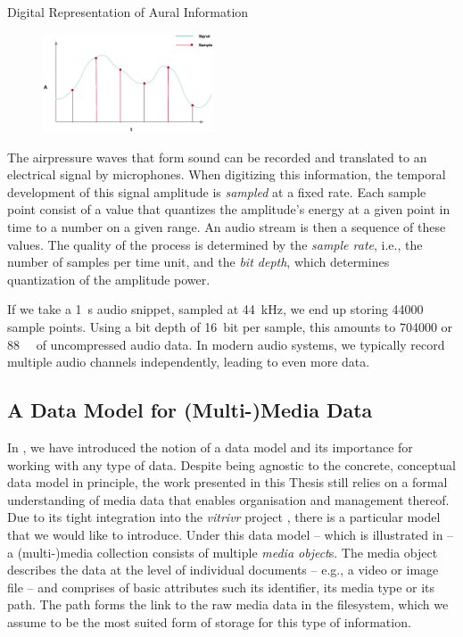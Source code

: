 \begin{example}[label=example:representation_audio_information]{Digital Representation of Aural Information}{}
    \begin{figure}
        \includegraphics[width=0.45\textwidth]{figures/example-audio-signal.eps}
    \end{figure}
    The airpressure waves that form sound can be recorded and translated to an electrical signal by microphones. When digitizing this information, the temporal development of this signal amplitude is \emph{sampled} at a fixed rate. Each sample point consist of a value that quantizes the amplitude's energy at a given point in time to a number on a given range. An audio stream is then a sequence of these values. The quality of the process is determined by the \emph{sample rate}, i.e., the number of samples per time unit, and the \emph{bit depth}, which determines quantization of the amplitude power.

    If we take a \SI{1}{\second} audio snippet, sampled at \SI{44}{\kilo\hertz}, we end up storing \num{44000} sample points. Using a bit depth of \SI{16}{bit} per sample, this amounts to \SI{704000}{\bit} or \SI{88}{\kilo\byte} of uncompressed audio data. In modern audio systems, we typically record multiple audio channels independently, leading to even more data.
\end{example}

\subsection{A Data Model for (Multi-)Media Data}
\label{section:media_data_model}
In , we have introduced the notion of a data model and its importance for working with any type of data. Despite being agnostic to the concrete, conceptual data model in principle, the work presented in this Thesis still relies on a formal understanding of media data that enables organisation and management thereof. Due to its tight integration into the \emph{vitrivr} project \cite{Rossetto:2016vitrivr,Gasser:2019multimodal,Heller:2020multi}, there is a particular model that we would like to introduce. Under this data model -- which is illustrated in  -- a (multi-)media collection consists of multiple \emph{media object}s. The media object describes the data at the level of individual documents -- e.g., a video or image file -- and comprises of basic attributes such its identifier, its media type or its path. The path forms the link to the raw media data in the filesystem, which we assume to be the most suited form of storage for this type of information. 


